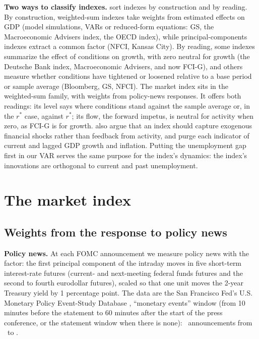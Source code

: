 \documentclass[11pt]{article}
\begin{document}
\textbf{Two ways to classify indexes.} \citet{hatzius2010} sort indexes by construction and by reading. By construction, weighted-sum indexes take weights from estimated effects on GDP (model simulations, VARs or reduced-form equations: GS, the Macroeconomic Advisers index, the OECD index), while principal-components indexes extract a common factor (NFCI, Kansas City). By reading, some indexes summarize the effect of conditions on growth, with zero neutral for growth (the Deutsche Bank index, Macroeconomic Advisers, and now FCI-G), and others measure whether conditions have tightened or loosened relative to a base period or sample average (Bloomberg, GS, NFCI). The market index sits in the weighted-sum family, with weights from policy-news responses. It offers both readings: its level says where conditions stand against the sample average or, in the $r^*$ case, against $r^*$; its flow, the forward impetus, is neutral for activity when zero, as FCI-G is for growth. \citet{hatzius2010} also argue that an index should capture exogenous financial shocks rather than feedback from activity, and purge each indicator of current and lagged GDP growth and inflation. Putting the unemployment gap first in our VAR serves the same purpose for the index's dynamics: the index's innovations are orthogonal to current and past unemployment.

\section{The market index}\label{sec:market}

\subsection{Weights from the response to policy news}

\textbf{Policy news.} At each FOMC announcement we measure policy news with the \citet{nakamura2018} factor: the first principal component of the intraday moves in five short-term interest-rate futures (current- and next-meeting federal funds futures and the second to fourth eurodollar futures), scaled so that one unit moves the 2-year Treasury yield by 1 percentage point. The data are the San Francisco Fed's U.S. Monetary Policy Event-Study Database \citep{acosta2025}, ``monetary events'' window (from 10 minutes before the statement to 60 minutes after the start of the press conference, or the statement window when there is none): \NEvents\ announcements from \EventFirst\ to \EventLast.
\end{document}
